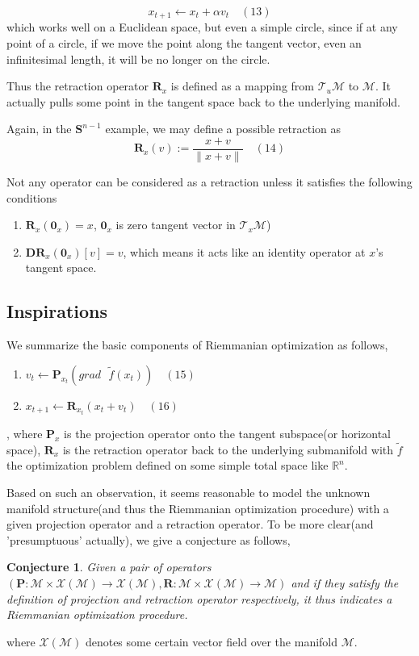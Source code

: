 \documentclass[letterpaper]{article}
\newtheorem{conj}{Conjecture}
\begin{document}
$$
    x_{t+1} \gets x_{t}+\alpha{\mathit{v_t}} \quad (13)
$$
which works well on a Euclidean space, but even a simple circle, since if at any point of a circle, if we move the point
along the tangent vector, even an infinitesimal length, it will be no longer on the circle.

Thus the retraction operator $\mathbf{R}_x$ is defined as a mapping from $\mathcal{T}_u\mathcal{M}$ to $\mathcal{M}$. It actually pulls some
point in the tangent space back to the underlying manifold.

Again, in the $\mathbf{S}^{n-1}$ example, we may define a possible retraction as
$$
  \mathbf{R}_x(\mathit{v}):=\frac{x+\mathit{v}}{\|x+\mathit{v}\|} \quad (14)
$$

Not any operator can be considered as a retraction unless it satisfies the following conditions
\begin{enumerate}
  \item $\mathbf{R}_x(\mathbf{0}_x)=x$, $\mathbf{0}_x$ is zero tangent vector in $\mathcal{T}_x{\mathcal{M}}$)
  \item $\mathbf{D}\mathbf{R}_x(\mathbf{0}_x)[v]=v$, which means it acts like an identity operator at $x$'s tangent space.
\end{enumerate}

\subsection{Inspirations}
We summarize the basic components of Riemmanian optimization as follows,
\begin{enumerate}
  \item $\mathit{v}_t \gets \mathbf{P}_{x_t}(grad\text{ }\tilde{f}(x_t)) \quad (15)$
  \item $\mathit{x_{t+1} \gets \mathbf{R}_{x_t}(x_t+\mathit{v}_t)} \quad (16)$
\end{enumerate}
, where $\mathbf{P}_x$ is the projection operator onto the tangent subspace(or horizontal space), $\mathbf{R}_x$ is the retraction operator back to
the underlying submanifold with $\tilde{f}$ the optimization problem defined on some simple total space like $\mathbb{R}^n$.

Based on such an observation, it seems reasonable to model the unknown manifold structure(and thus the Riemmanian optimization procedure) with a given projection operator and a retraction operator.
To be more clear(and 'presumptuous' actually), we give a conjecture as follows,
\begin{conj}
Given a pair of operators $(\mathbf{P}:\mathcal{M}\times\mathcal{X}(\mathcal{M})\to\mathcal{X}(\mathcal{M}),\mathbf{R}:\mathcal{M}\times\mathcal{X}(\mathcal{M})\to\mathcal{M})$ and if they satisfy the definition of projection and retraction operator respectively, it thus indicates a Riemmanian optimization procedure.
\end{conj}
where $\mathcal{X}(\mathcal{M})$ denotes some certain vector field over the manifold $\mathcal{M}$.
\end{document}
